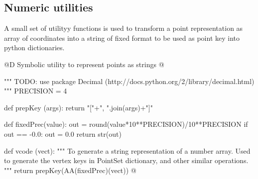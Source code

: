 \documentclass[11pt,oneside]{article}	%
\begin{document}
\subsection{Numeric utilities}

A small set of utilityy functions is used to transform a point representation as array of coordinates into a string of fixed format to be used as point key into python dictionaries.

@D Symbolic utility to represent points as strings
@{""" TODO: use package Decimal (http://docs.python.org/2/library/decimal.html) """
PRECISION = 4 

def prepKey (args): return "["+", ".join(args)+"]"

def fixedPrec(value):
	out = round(value*10**PRECISION)/10**PRECISION
	if out == -0.0: out = 0.0
	return str(out)
	
def vcode (vect): 
	"""
	To generate a string representation of a number array.
	Used to generate the vertex keys in PointSet dictionary, and other similar operations.
	"""
	return prepKey(AA(fixedPrec)(vect))
@}







\end{document}
